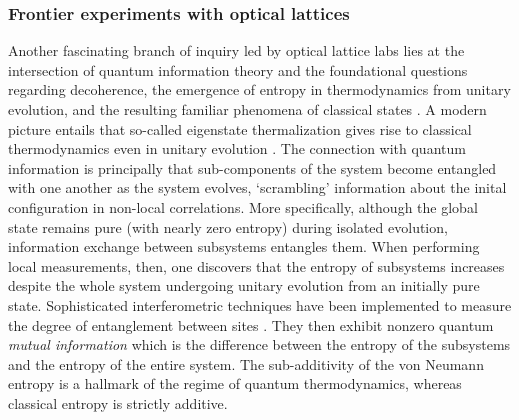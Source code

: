 \subsubsection{Frontier experiments with optical lattices}
	Another fascinating branch of inquiry led by optical lattice labs lies at the intersection of quantum information theory and the foundational questions regarding decoherence, the emergence of entropy in thermodynamics from unitary evolution, and the resulting familiar phenomena of classical states \cite{Osborne02,Osterloh02,Isakov11,Jiang12,Dalessio16,Goold16,Srednicki94,Amico08,Eisert15}.
	A modern picture entails that so-called eigenstate thermalization gives rise to classical thermodynamics even in unitary evolution \cite{Srednicki94,Dalessio16,Goold16}.
	The connection with quantum information is principally that sub-components of the system become entangled with one another as the system evolves, `scrambling' information about the inital configuration in non-local correlations.
	More specifically, although the global state remains pure (with nearly zero entropy) during isolated evolution, information exchange between subsystems entangles them.
	When performing local measurements, then, one discovers that the entropy of subsystems increases despite the whole system undergoing unitary evolution from an initially pure state.
	Sophisticated interferometric techniques have been implemented to measure the degree of entanglement between sites \cite{Brydges19,Daley12,Mouraalves04,Palmer05}.
	They then exhibit nonzero quantum \emph{mutual information} which is the difference between the entropy of the subsystems and the entropy of the entire system.
	The sub-additivity of the von Neumann entropy is a hallmark of the regime of quantum thermodynamics, whereas classical entropy is strictly additive.
	
